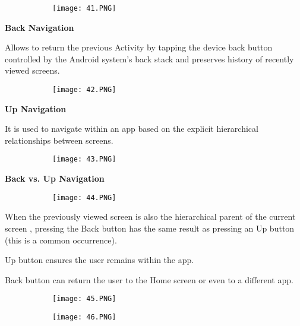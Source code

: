 \documentclass{article}
\begin{document}
\begin{figure}[ht!]
  \centering
  \begin{subfigure}[b]{0.6\linewidth}
    \texttt{[image: 41.PNG]}
  \end{subfigure}
  \end{figure}

  \vspace{50mm}

  \textbf{Back Navigation}

Allows to return the previous Activity by tapping the device back button controlled by the Android system's back stack and preserves history of recently viewed screens.

\begin{figure}[ht!]
  \centering
  \begin{subfigure}[b]{0.8\linewidth}
    \texttt{[image: 42.PNG]}
  \end{subfigure}
  \end{figure}


\textbf{Up Navigation}

It is used to navigate within an app based on the explicit hierarchical relationships between screens.

\begin{figure}[ht!]
  \centering
  \begin{subfigure}[b]{0.8\linewidth}
    \texttt{[image: 43.PNG]}
  \end{subfigure}
  \end{figure}

  \textbf{Back vs. Up Navigation}

  \begin{figure}[ht!]
  \centering
  \begin{subfigure}[b]{0.8\linewidth}
    \texttt{[image: 44.PNG]}
  \end{subfigure}
  \end{figure}

  When the previously viewed screen is also the hierarchical parent of the current screen , pressing the Back button has the same result as pressing an Up button (this is a common occurrence).

  Up button ensures the user remains within the app.

  Back button can return the user to the Home screen or even to a different app.

  \begin{figure}[ht!]
  \centering
  \begin{subfigure}[b]{0.5\linewidth}
    \texttt{[image: 45.PNG]}
  \end{subfigure}
     \begin{subfigure}[b]{0.49\textwidth}
         \centering
         \texttt{[image: 46.PNG]}
     \end{subfigure}
\end{figure}
\end{document}
